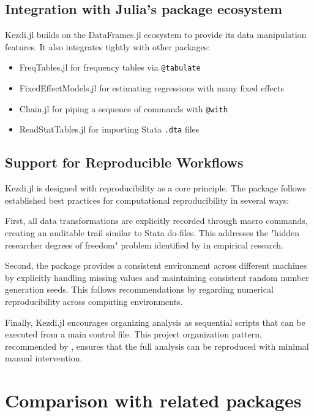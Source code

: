 \documentclass{juliacon}
\begin{document}
\subsection{Integration with Julia's package ecosystem}

Kezdi.jl builds on the DataFrames.jl ecosystem \cite{DataFrame.jl2023} to provide its data manipulation features. It also integrates tightly with other packages:

\begin{itemize}
	\item FreqTables.jl \cite{FreqTables.jl2023} for frequency tables via \texttt{@tabulate}
	\item FixedEffectModels.jl \cite{FixedEffectModels.jl2023} for estimating regressions with many fixed effects
	\item Chain.jl for piping a sequence of commands with \texttt{@with}
	\item ReadStatTables.jl for importing Stata \texttt{.dta} files
\end{itemize}

\subsection{Support for Reproducible Workflows}

Kezdi.jl is designed with reproducibility as a core principle. The package follows established best practices for computational reproducibility \cite{krafczyk2021learning} in several ways:

First, all data transformations are explicitly recorded through macro commands, creating an auditable trail similar to Stata do-files. This addresses the "hidden researcher degrees of freedom" problem identified by \cite{huntington2021influence} in empirical research.

Second, the package provides a consistent environment across different machines by explicitly handling missing values and maintaining consistent random number generation seeds. This follows recommendations by \cite{mccullough1999numerical} regarding numerical reproducibility across computing environments.

Finally, Kezdi.jl encourages organizing analysis as sequential scripts that can be executed from a main control file. This project organization pattern, recommended by \cite{koren2024ten}, ensures that the full analysis can be reproduced with minimal manual intervention.

\section{Comparison with related packages}
\end{document}
